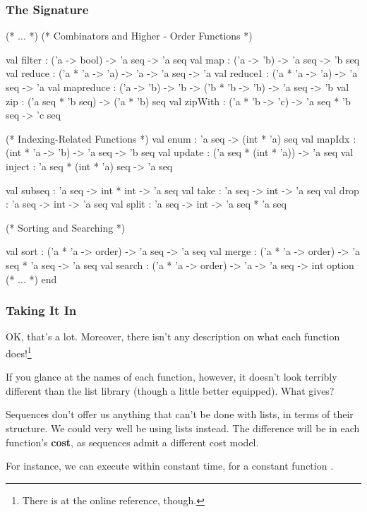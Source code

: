 \documentclass[aspectratio=169, handout]{beamer}
\begin{document}
\begin{frame}[fragile]
  \frametitle{The  Signature}

  \tiny
  \begin{codeblock}
    (* ... *)
      (* Combinators and Higher - Order Functions *)

      val filter : ('a -> bool) -> 'a seq -> 'a seq
      val map : ('a -> 'b) -> 'a seq -> 'b seq
      val reduce : ('a * 'a -> 'a) -> 'a -> 'a seq -> 'a
      val reduce1 : ('a * 'a -> 'a) -> 'a seq -> 'a
      val mapreduce : ('a -> 'b) -> 'b -> ('b * 'b -> 'b) -> 'a seq -> 'b
      val zip : ('a seq * 'b seq) -> ('a * 'b) seq
      val zipWith : ('a * 'b -> 'c) -> 'a seq * 'b seq -> 'c seq

      (* Indexing-Related Functions *)
      val enum : 'a seq -> (int * 'a) seq
      val mapIdx : (int * 'a -> 'b) -> 'a seq -> 'b seq
      val update : ('a seq * (int * 'a)) -> 'a seq
      val inject : 'a seq * (int * 'a) seq -> 'a seq

      val subseq : 'a seq -> int * int -> 'a seq
      val take : 'a seq -> int -> 'a seq
      val drop : 'a seq -> int -> 'a seq
      val split : 'a seq -> int -> 'a seq * 'a seq

      (* Sorting and Searching *)

      val sort : ('a * 'a -> order) -> 'a seq -> 'a seq
      val merge : ('a * 'a -> order) -> 'a seq * 'a seq -> 'a seq
      val search : ('a * 'a -> order) -> 'a -> 'a seq -> int option
      (* ... *)
    end
  \end{codeblock}
\end{frame}

\begin{frame}[fragile]
  \frametitle{Taking It In}

  OK, that's a lot. Moreover, there isn't any description on what each
  function does!\footnote{There is at the online reference, though.}

  \vspace{\fill}

  If you glance at the names of each function, however, it doesn't look
  terribly different than the list library (though a little better equipped).
  What gives?

  \pause
  \vspace{\fill}

  Sequences don't offer us anything that can't be done with lists, in terms
  of their structure. We could very well be using lists instead. The difference
  will be in each function's \textbf{cost}, as sequences admit a different
  cost model.

  \pause
  \vspace{\fill}


  \pause
  \vspace{\fill}

  For instance, we can execute  within constant time, for a
  constant function .
\end{frame}
\end{document}
